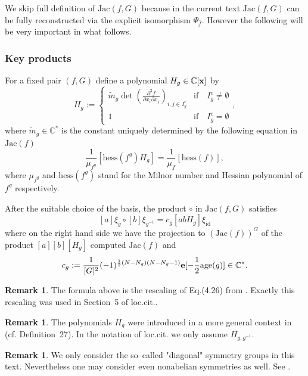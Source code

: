 \documentclass[reqno,12pt]{amsart}
\numberwithin{equation}{section}
\theoremstyle{plain}
\theoremstyle{definition}
\newtheorem{remark}[theorem]{Remark}
\newcommand{\CC}{{\mathbb{C}}}
\newcommand{\epi}{{\bf e}}
\newcommand{\Jac}{\mathrm{Jac}}
\newcommand{\id}{\mathrm{id}}
\newcommand{\bx}{{\bf x}}
\newcommand{\hess}{\mathrm{hess}}
\newcommand{\age}{\mathrm{age}}
\numberwithin{equation}{section}
\begin{document}
We skip full definition of $\Jac(f,G)$ because in the current text $\Jac(f,G)$ can be fully reconstructed via the explicit isomorphism $\Psi_{\bar f}$. However the following will be very important in what follows.

\subsubsection{Key products}\label{section: H_g}
For a fixed pair $(f,G)$ define a polynomial 
$H_{g} \in \CC[\bx]$ by
\begin{equation}
H_{g}:=
\begin{cases}
\widetilde{m}_{g}\det \left(\frac{\partial^2 f}{\partial x_{i} \partial x_{j}}\right)_{i,j\in I_{g}^c} 
& \text{if} \quad I_{g}^c \neq \emptyset\\
1 & \text{if} \quad I_{g}^c = \emptyset
\end{cases},
\end{equation}
where $\widetilde{m}_{g}\in\CC^\ast$ is the constant uniquely determined by the following equation in $\Jac(f)$
\begin{equation}\label{H and hessians}
\frac{1}{\mu_{f^{g}}}[\hess(f^{g})H_{g}]=\frac{1}{\mu_{f}}[\hess(f)],
\end{equation}
where $\mu_{f^{g}}$ and $\hess(f^g)$ stand for the Milnor number and Hessian polynomial of $f^g$ respectively.

After the suitable choice of the basis, the product $\circ$ in $\Jac(f,G)$ satisfies
\[
    [a]\xi_g \circ [b]\xi_{g^{-1}} = c_g [a b H_g]\xi_\id
\]
where on the right hand side we have the projection to $(\Jac(f))^G$ of the product $[a][b][H_g]$ computed $\Jac(f)$ and 
\[
    c_g := \frac{1}{[G]^2} (-1)^{\frac{1}{2}(N-N_g)(N-N_g-1)} \epi[- \frac{1}{2}\age (g)] \in \CC^\ast.
\]
\begin{remark}
The formula above is the rescaling of Eq.(4.26) from \cite{BTW1}. Exactly this rescaling was used in Section~5 of loc.cit.. 
\end{remark}
\begin{remark}
The polynomials $H_g$ were introduced in a more general context in \cite{BTW1} (cf. Definition~27). In the notation of loc.cit. we only assume $H_{g,g^{-1}}$.
\end{remark}

\begin{remark}
    We only consider the so--called "diagonal" symmetry groups in this text. Nevertheless one may consider even nonabelian symmetries as well. See \cite{B25,BI22,BI24,BI21}.
\end{remark}
\end{document}
